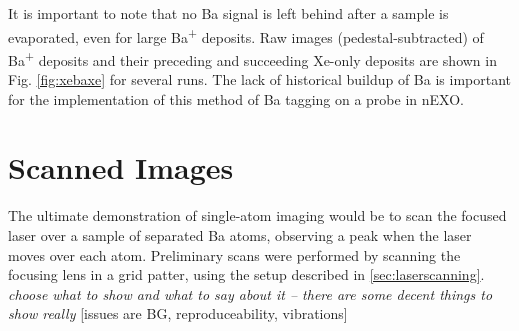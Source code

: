 It is important to note that no Ba signal is left behind after a sample is evaporated, even for large Ba\textsuperscript{+} deposits.  Raw images (pedestal-subtracted) of Ba\textsuperscript{+} deposits and their preceding and succeeding Xe-only deposits are shown in Fig. \ref{fig:xebaxe} for several runs.  The lack of historical buildup of Ba is important for the implementation of this method of Ba tagging on a probe in nEXO.

\section{Scanned Images}
\label{sec:scanning}

The ultimate demonstration of single-atom imaging would be to scan the focused laser over a sample of separated Ba atoms, observing a peak when the laser moves over each atom.  Preliminary scans were performed by scanning the focusing lens in a grid patter, using the setup described in \ref{sec:laserscanning}.   \emph{\color{gray}choose what to show and what to say about it -- there are some decent things to show really}  [issues are BG, reproduceability, vibrations]
